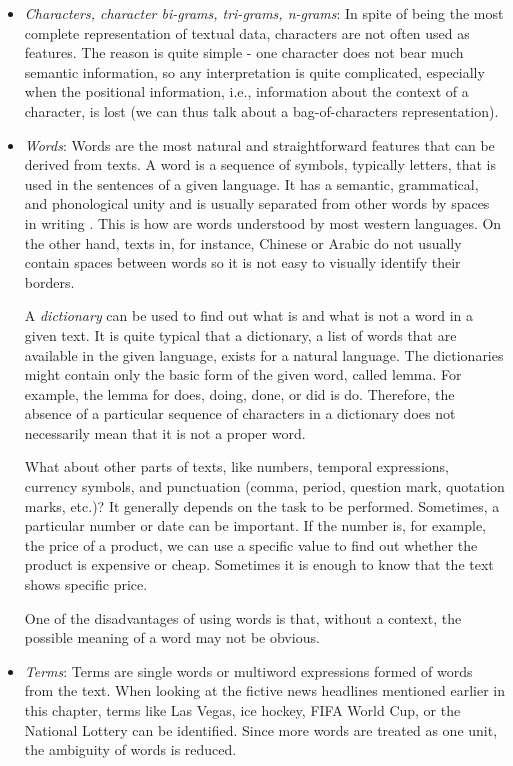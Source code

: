 \documentclass[11pt,openany,executivepaper]{book}
\begin{document}
\begin{itemize}
  \item \textit{Characters, character bi-grams, tri-grams, n-grams}: In spite of being the most complete representation of textual data, characters are not often used as features. The reason is quite simple - one character does not bear much semantic information, so any interpretation is quite complicated, especially when the positional information, i.e., information about the context of a character, is lost (we can thus talk about a bag-of-characters representation).
  \item \textit{Words}: Words are the most natural and straightforward features that can be derived from texts. A word is a sequence of symbols, typically letters, that is used in the sentences of a given language. It has a semantic, grammatical, and phonological unity and is usually separated from other words by spaces in writing \cite{74}. This is how are words understood by most western languages. On the other hand, texts in, for instance, Chinese or Arabic do not usually contain spaces between words so it is not easy to visually identify their borders. 
  
  A \textit{dictionary} can be used to find out what is and what is not a word in a given text. It is quite typical that a dictionary, a list of words that are available in the given language, exists for a natural language. The dictionaries might contain only the basic form of the given word, called lemma. For example, the lemma for does, doing, done, or did is do. Therefore, the absence of a particular sequence of characters in a dictionary does not necessarily mean that it is not a proper word.
  \bigskip

  What about other parts of texts, like numbers, temporal expressions, currency symbols, and punctuation (comma, period, question mark, quotation marks, etc.)? It generally depends on the task to be performed. Sometimes, a particular number or date can be important. If the number is, for example, the price of a product, we can use a specific value to find out whether the product is expensive or cheap. Sometimes it is enough to know that the text shows specific price.
  \bigskip
  
  One of the disadvantages of using words is that, without a context, the possible meaning of a word may not be obvious.
  \bigskip
  
  \item \textit{Terms}: Terms are single words or multiword expressions formed of words from the text. When looking at the fictive news headlines mentioned earlier in this chapter, terms like Las Vegas, ice hockey, FIFA World Cup, or the National Lottery can be identified. Since more words are treated as one unit, the ambiguity of words is reduced.
  \bigskip


\end{itemize}
\end{document}
